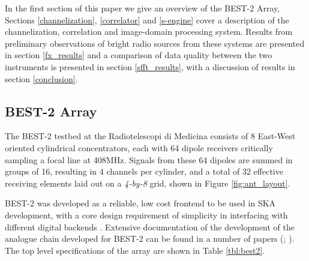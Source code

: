 \documentclass[useAMS,macros,usenatbib]{mn2e}
\begin{document}
In the first section of this paper we give an overview of the BEST-2 Array, Sections \ref{channelization}, \ref{correlator} and \ref{s-engine} cover a description of the channelization, correlation and image-domain processing system.
Results from preliminary observations of bright radio sources from these systems are presented in section \ref{fx_results} and a comparison of data quality between the two instruments is presented in section \ref{sfft_results}, with a discussion of results in section \ref{conclusion}.

\subsection{BEST-2 Array}
\label{best-2 array}

The BEST-2 testbed at the Radiotelescopi di Medicina consists of 8 East-West oriented cylindrical concentrators, each with 64 dipole receivers critically sampling a focal line at 408MHz.
Signals from these 64 dipoles are summed in groups of 16, resulting in 4 channels per cylinder, and a total of 32 effective receiving elements laid out on a \emph{4-by-8} grid, shown in Figure \ref{fig:ant_layout}.

BEST-2 was developed as a reliable, low cost frontend to be used in SKA development, with a core design requirement of simplicity in interfacing with different digital backends \citep{best2}.
Extensive documentation of the development of the analogue chain developed for BEST-2 can be found in a number of papers (\cite{best2-lna}; \cite{best2-rec}). The top level specifications of the array are shown in Table \ref{tbl:best2}.

\end{document}

